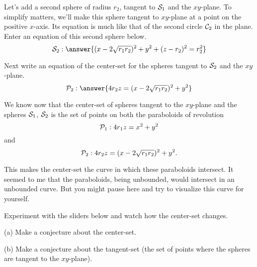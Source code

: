 \documentclass{ximera}
\begin{document}
\begin{question}  \label{Q365434:Spheres}
Let's add a second sphere of radius $r_2$, tangent to ${\cal S}_1$ and the $xy$-plane. To simplify matters, we'll make this sphere tangent to $xy$-plane at a point on the positive $x$-axis. Its equation is much like that of the second circle ${\cal C}_2$ in the plane. Enter an equation of this second sphere below.
\[
   {\cal S}_2: \answer{(x-2\sqrt{r_1r_2})^2 + y^2 + (z-r_2)^2 = r_2^2}
\]

Next write an equation of the center-set for the spheres tangent to ${\cal S}_2$ and the $xy$-plane.
\[
   {\cal P}_2:  \answer{4r_2z = (x-2\sqrt{r_1r_2})^2 + y^2}
\]

\end{question}



We know now that the center-set of spheres tangent to the $xy$-plane and the spheres ${\cal S}_1$, ${\cal S}_2$ is the set of points on both the paraboloids of revolution
\[
   {\cal P}_1:  4 r_1z  = x^2 + y^2
\]
and 
\[
     {\cal P}_2:  4r_2z = (x-2\sqrt{r_1r_2})^2 + y^2 .
\]

This makes the center-set the curve in which these paraboloids intersect. It seemed to me that the paraboloids, being unbounded, would intersect in an unbounded curve. But you might pause here and try to visualize this curve for yourself.


\begin{exploration}  \label{Exsdsdfsdf:Spheres}
Experiment with the sliders below and watch how the center-set changes. 

(a) Make a conjecture about the center-set.

(b) Make a conjecture about the tangent-set (the set of points where the spheres are tangent to the $xy$-plane).

 
\begin{onlineOnly}
    \begin{center}
\end{center}
\end{onlineOnly}


\end{exploration}
\end{document}
